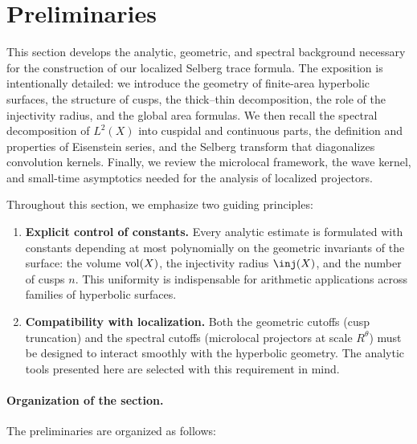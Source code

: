 \section{Preliminaries}\label{sec:prelim}

This section develops the analytic, geometric, and spectral background
necessary for the construction of our localized Selberg trace formula.
The exposition is intentionally detailed: we introduce the geometry of
finite-area hyperbolic surfaces, the structure of cusps, the thick--thin
decomposition, the role of the injectivity radius, and the global area
formulas. We then recall the spectral decomposition of $L^2(X)$ into
cuspidal and continuous parts, the definition and properties of Eisenstein
series, and the Selberg transform that diagonalizes convolution kernels.
Finally, we review the microlocal framework, the wave kernel, and
small-time asymptotics needed for the analysis of localized projectors.

Throughout this section, we emphasize two guiding principles:

\begin{enumerate}
  \item \textbf{Explicit control of constants.}
        Every analytic estimate is formulated with constants depending at most
        polynomially on the geometric invariants of the surface:
        the volume $\operatorname{vol}(X)$, the injectivity radius $\inj(X)$, and the number
        of cusps $n$. This uniformity is indispensable for arithmetic
        applications across families of hyperbolic surfaces.
  \item \textbf{Compatibility with localization.}
        Both the geometric cutoffs (cusp truncation) and the spectral
        cutoffs (microlocal projectors at scale $R^\theta$) must be designed
        to interact smoothly with the hyperbolic geometry. The analytic tools
        presented here are selected with this requirement in mind.
\end{enumerate}

\paragraph{Organization of the section.}
The preliminaries are organized as follows:

